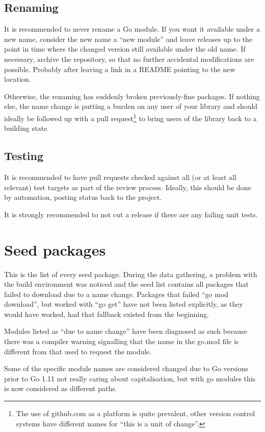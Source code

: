 \documentclass[a4paper]{paper}
\begin{document}
\subsection{Renaming}
It is recommended to never rename a Go module. If you want it available
under a new name, consider the new name a ``new module'' and leave
releases up to the point in time where the changed version still
available under the old name. If necessary, archive the repository, so
that no further accidental modifications are possible. Probably after
leaving a link in a README pointing to the new location.

Otherwise, the renaming has suddenly broken previously-fine
packages. If nothing else, the name change is putting a burden on any
user of your library and should ideally be followed up with a pull
request\footnote{The use of github.com as a platform is quite
  prevalent, other version control systems have different names for
  ``this is a unit of change''.} to bring users of the library back to
a building state.

\subsection{Testing}

It is recommended to have pull requests checked against all (or at least all relevant) test targets as part of the review process. Ideally, this should be done by automation, posting status back to the project.

It is strongly recommended to not cut a release if there are any failing unit tests.

\section{Seed packages}

This is the list of every seed package. During the data gathering, a problem with the build environment was noticed and the seed list contains all packages that failed to download due to a name change. Packages that failed ``go mod download'', but worked with ``go get'' have not been listed explicitly, as they would have worked, had that fallback existed from the beginning.

Modules listed as ``due to name change'' have been diagnosed as such because there was a compiler warning signalling that the name in the go.mod file is different from that used to request the module.

Some of the specific module names are considered changed due to Go versions prior to Go 1.11 not really caring about capitalisation, but with go modules this is now considered as different paths.


\end{document}
